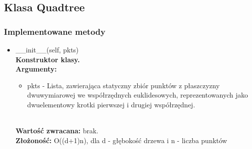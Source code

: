 \documentclass{article}
\begin{document}
        \subsection{Klasa Quadtree}
            \subsubsection{Implementowane metody}
                \begin{itemize}
                    \item \_\_init\_\_(self, pkts)\\
                        \textbf{Konstruktor klasy.} \\
                        \textbf{Argumenty:} \begin{itemize}
                                \item pkts - Lista, zawierająca statyczny zbiór punktów z płaszczyzny dwuwymiarowej we współrzędnych euklidesowych, reprezentowanych jako dwuelementowy krotki pierwszej i drugiej współrzędnej.  
                            \end{itemize}\\
                        \textbf{Wartość zwracana:} brak.\\
                        \textbf{Złożoność: } O((d+1)n), dla d - głębokość drzewa i n - liczba punktów
                    

\end{itemize}
\end{document}
